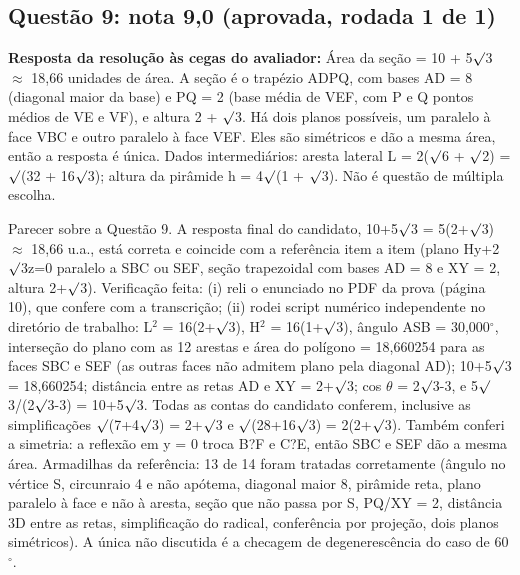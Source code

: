 \documentclass{article}%
\begin{document}
\subsection*{Questão 9: nota 9,0 (aprovada, rodada 1 de 1)}%
\textbf{Resposta da resolução às cegas do avaliador:} Área da seção = 10 + 5$\surd$3 $\approx$ 18,66 unidades de área.\newline%
\newline%
A seção é o trapézio ADPQ, com bases AD = 8 (diagonal maior da base) e PQ = 2 (base média de VEF, com P e Q pontos médios de VE e VF), e altura 2 + $\surd$3. Há dois planos possíveis, um paralelo à face VBC e outro paralelo à face VEF. Eles são simétricos e dão a mesma área, então a resposta é única.\newline%
\newline%
Dados intermediários: aresta lateral L = 2($\surd$6 + $\surd$2) = $\surd$(32 + 16$\surd$3); altura da pirâmide h = 4$\surd$(1 + $\surd$3).\newline%
\newline%
Não é questão de múltipla escolha.\par %
Parecer sobre a Questão 9. A resposta final do candidato, 10+5$\surd$3 = 5(2+$\surd$3) $\approx$ 18,66 u.a., está correta e coincide com a referência item a item (plano Hy+2$\surd$3z=0 paralelo a SBC ou SEF, seção trapezoidal com bases AD = 8 e XY = 2, altura 2+$\surd$3).\newline%
\newline%
Verificação feita: (i) reli o enunciado no PDF da prova (página 10), que confere com a transcrição; (ii) rodei script numérico independente no diretório de trabalho: L$^2$ = 16(2+$\surd$3), H$^2$ = 16(1+$\surd$3), ângulo ASB = 30,000$^\circ$, interseção do plano com as 12 arestas e área do polígono = 18,660254 para as faces SBC e SEF (as outras faces não admitem plano pela diagonal AD); 10+5$\surd$3 = 18,660254; distância entre as retas AD e XY = 2+$\surd$3; cos $\theta$ = 2$\surd$3-3, e 5$\surd$3/(2$\surd$3-3) = 10+5$\surd$3. Todas as contas do candidato conferem, inclusive as simplificações $\surd$(7+4$\surd$3) = 2+$\surd$3 e $\surd$(28+16$\surd$3) = 2(2+$\surd$3). Também conferi a simetria: a reflexão em y = 0 troca B?F e C?E, então SBC e SEF dão a mesma área.\newline%
\newline%
Armadilhas da referência: 13 de 14 foram tratadas corretamente (ângulo no vértice S, circunraio 4 e não apótema, diagonal maior 8, pirâmide reta, plano paralelo à face e não à aresta, seção que não passa por S, PQ/XY = 2, distância 3D entre as retas, simplificação do radical, conferência por projeção, dois planos simétricos). A única não discutida é a checagem de degenerescência do caso de 60$^\circ$.\newline%
\end{document}
